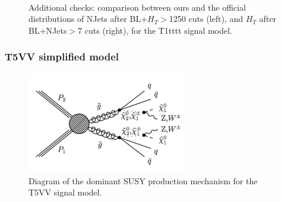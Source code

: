         \begin{figure}
        \centering
        \hspace{-1 cm}
        ~ %
        \caption{Additional checks: comparison between ours and the official distributions of NJets after BL+$H_T$$>$1250 cuts (left), and $H_T$ after BL+NJets$>$7 cuts (right), for the T1tttt signal model.}
        \end{figure}  
        

\clearpage
\subsubsection{T5VV simplified model}

\begin{figure}[h!]
\centering
\includegraphics[width=7cm]{figures/Appendices/Ma5ValidationSUS13012/T5VV.pdf}
\caption{Diagram of the dominant SUSY production mechanism
for the T5VV signal model.}
\label{fig:T5VV}
\end{figure}

